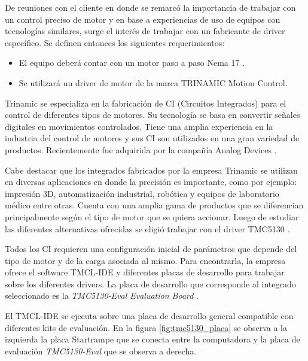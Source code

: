 De reuniones con el cliente en donde se remarcó la importancia de trabajar con un control preciso de motor y en base a experiencias de uso de equipos con tecnologías similares, surge el interés de trabajar con un fabricante de driver específico. Se definen entonces los siguientes requerimientos:
			
\begin{itemize}
\item El equipo deberá contar con un motor paso a paso Nema 17 \citep{web_nema17}.
\item Se utilizará un driver de motor de la marca TRINAMIC Motion Control.
\end{itemize}

Trinamic \citep{3_web_trinamic} se especializa en la fabricación de CI (Circuitos Integrados) para el control de diferentes tipos de motores. Su tecnología se basa en convertir señales digitales en movimientos controlados. Tiene una amplia experiencia en la industria del control de motores y sus CI son utilizados en una gran variedad de productos. Recientemente fue adquirida por la compañía Analog Devices \citep{web_analogdevices}.

Cabe destacar que los integrados fabricados por la empresa Trinamic se utilizan en diversas aplicaciones en donde la precisión es importante, como por ejemplo: impresión 3D, automatización industrial, robótica y equipos de laboratorio médico entre otras.
Cuenta con una amplia gama de productos que se diferencian principalmente según el tipo de motor que se quiera accionar. Luego de estudiar las diferentes alternativas ofrecidas se eligió trabajar con el driver TMC5130 \citep{3_web_trinamic_producto}.
  
Todos los CI requieren una configuración inicial de parámetros que depende del tipo de motor y de la carga asociada al mismo. Para encontrarla, la empresa ofrece el software TMCL-IDE y diferentes placas de desarrollo para trabajar sobre los diferentes drivers. La placa de desarrollo que corresponde al integrado seleccionado es la \textit{TMC5130-Eval Evaluation Board} \citep{3_web_trinamic_placa}.

El TMCL-IDE se ejecuta sobre una placa de desarrollo general compatible con diferentes kits de evaluación. En la figura \ref{fig:tmc5130_placa} se observa a la izquierda la placa Startrampe  que se conecta entre la computadora y la placa de evaluación \textit{TMC5130-Eval} que se observa a derecha. 

